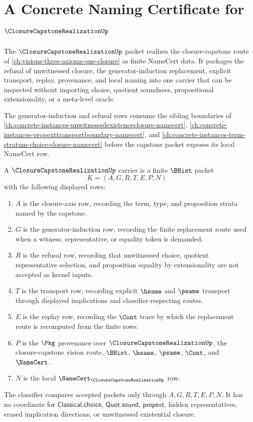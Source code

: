 \chapter{A Concrete Naming Certificate for $\ClosureCapstoneRealizationUp$}
\label{ch:concrete-instances-closure-capstone-realization-namecert}

The $\ClosureCapstoneRealizationUp$ packet realizes the closure-capstone route of \autoref{ch:visions-three-axioms-one-closure} as finite NameCert data. It packages the refusal of unwitnessed closure, the generator-induction replacement, explicit transport, replay, provenance, and local naming into one carrier that can be inspected without importing choice, quotient soundness, propositional extensionality, or a meta-level oracle.

The generator-induction and refusal rows consume the sibling boundaries of \autoref{ch:concrete-instances-unwitnessedexistenceclosure-namecert}, \autoref{ch:concrete-instances-propexttransportboundary-namecert}, and \autoref{ch:concrete-instances-term-stratum-choice-closure-namecert} before the capstone packet exposes its local NameCert row.

\begin{definition}
\label{def:closure-capstone-realization-carrier}
A $\ClosureCapstoneRealizationUp$ carrier is a finite $\BHist$ packet
$$
K=(A,G,R,T,E,P,N)
$$
with the following displayed rows:
\begin{enumerate}
\item $A$ is the closure-axis row, recording the term, type, and proposition strata named by the capstone.
\item $G$ is the generator-induction row, recording the finite replacement route used when a witness, representative, or equality token is demanded.
\item $R$ is the refusal row, recording that unwitnessed choice, quotient representative selection, and proposition equality by extensionality are not accepted as kernel inputs.
\item $T$ is the transport row, recording explicit $\hsame$ and $\psame$ transport through displayed implications and classifier-respecting routes.
\item $E$ is the replay row, recording the $\Cont$ trace by which the replacement route is recomputed from the finite rows.
\item $P$ is the $\Pkg$ provenance over $\ClosureCapstoneRealizationUp$, the closure-capstone vision route, $\BHist$, $\hsame$, $\psame$, $\Cont$, and $\NameCert$.
\item $N$ is the local $\NameCert_{\ClosureCapstoneRealizationUp}$ row.
\end{enumerate}
The classifier compares accepted packets only through $A,G,R,T,E,P,N$. It has no coordinate for $\mathsf{Classical.choice}$, $\mathsf{Quot.sound}$, $\mathsf{propext}$, hidden representatives, erased implication directions, or unwitnessed existential closure.
\end{definition}

